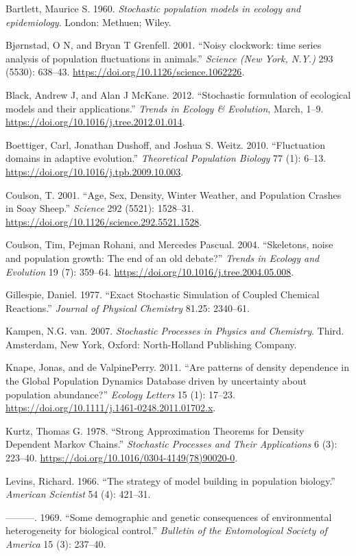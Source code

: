 \documentclass[3p]{elsarticle} %
\begin{document}
\hypertarget{refs}{}
\leavevmode\hypertarget{ref-Bartlett1960}{}%
Bartlett, Maurice S. 1960. \emph{Stochastic population models in ecology
and epidemiology}. London: Methuen; Wiley.

\leavevmode\hypertarget{ref-Bjornstad2001}{}%
Bjørnstad, O N, and Bryan T Grenfell. 2001. ``Noisy clockwork: time
series analysis of population fluctuations in animals.'' \emph{Science
(New York, N.Y.)} 293 (5530): 638--43.
\url{https://doi.org/10.1126/science.1062226}.

\leavevmode\hypertarget{ref-Black2012}{}%
Black, Andrew J, and Alan J McKane. 2012. ``Stochastic formulation of
ecological models and their applications.'' \emph{Trends in Ecology \&
Evolution}, March, 1--9.
\url{https://doi.org/10.1016/j.tree.2012.01.014}.

\leavevmode\hypertarget{ref-Boettiger2010}{}%
Boettiger, Carl, Jonathan Dushoff, and Joshua S. Weitz. 2010.
``Fluctuation domains in adaptive evolution.'' \emph{Theoretical
Population Biology} 77 (1): 6--13.
\url{https://doi.org/10.1016/j.tpb.2009.10.003}.

\leavevmode\hypertarget{ref-Coulson2001}{}%
Coulson, T. 2001. ``Age, Sex, Density, Winter Weather, and Population
Crashes in Soay Sheep.'' \emph{Science} 292 (5521): 1528--31.
\url{https://doi.org/10.1126/science.292.5521.1528}.

\leavevmode\hypertarget{ref-Coulson2004}{}%
Coulson, Tim, Pejman Rohani, and Mercedes Pascual. 2004. ``Skeletons,
noise and population growth: The end of an old debate?'' \emph{Trends in
Ecology and Evolution} 19 (7): 359--64.
\url{https://doi.org/10.1016/j.tree.2004.05.008}.

\leavevmode\hypertarget{ref-Gillespie1977}{}%
Gillespie, Daniel. 1977. ``Exact Stochastic Simulation of Coupled
Chemical Reactions.'' \emph{Journal of Physical Chemistry} 81.25:
2340--61.

\leavevmode\hypertarget{ref-vanKampen2007}{}%
Kampen, N.G. van. 2007. \emph{Stochastic Processes in Physics and
Chemistry}. Third. Amsterdam, New York, Oxford: North-Holland Publishing
Company.

\leavevmode\hypertarget{ref-Knape2011}{}%
Knape, Jonas, and de ValpinePerry. 2011. ``Are patterns of density
dependence in the Global Population Dynamics Database driven by
uncertainty about population abundance?'' \emph{Ecology Letters} 15 (1):
17--23. \url{https://doi.org/10.1111/j.1461-0248.2011.01702.x}.

\leavevmode\hypertarget{ref-Kurtz1978}{}%
Kurtz, Thomas G. 1978. ``Strong Approximation Theorems for Density
Dependent Markov Chains.'' \emph{Stochastic Processes and Their
Applications} 6 (3): 223--40.
\url{https://doi.org/10.1016/0304-4149(78)90020-0}.

\leavevmode\hypertarget{ref-Levins1966}{}%
Levins, Richard. 1966. ``The strategy of model building in population
biology.'' \emph{American Scientist} 54 (4): 421--31.

\leavevmode\hypertarget{ref-Levins1969}{}%
---------. 1969. ``Some demographic and genetic consequences of
environmental heterogeneity for biological control.'' \emph{Bulletin of
the Entomological Society of America} 15 (3): 237--40.
\end{document}
